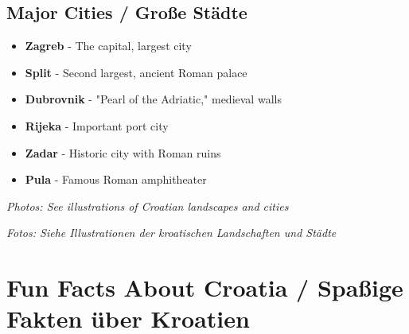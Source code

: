 \begin{culture}
\subsection*{Major Cities / Große Städte}

\begin{itemize}
    \item \textbf{Zagreb} - The capital, largest city
    \item \textbf{Split} - Second largest, ancient Roman palace
    \item \textbf{Dubrovnik} - "Pearl of the Adriatic," medieval walls
    \item \textbf{Rijeka} - Important port city
    \item \textbf{Zadar} - Historic city with Roman ruins
    \item \textbf{Pula} - Famous Roman amphitheater
\end{itemize}

\textit{Photos: See illustrations of Croatian landscapes and cities}

\textit{Fotos: Siehe Illustrationen der kroatischen Landschaften und Städte}
\end{culture}

\section{Fun Facts About Croatia / Spaßige Fakten über Kroatien}

